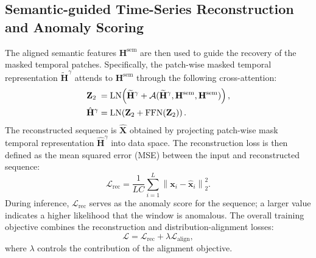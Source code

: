 \documentclass[letterpaper]{article} %
\begin{document}
\subsection{Semantic-guided Time-Series Reconstruction and Anomaly Scoring}
The aligned semantic features
$\mathbf{H}^{\mathrm{sem}}$ are then used to guide the recovery of the masked temporal patches. Specifically, the patch-wise masked temporal representation 
$\widetilde{\mathbf{H}}^{\gamma}$ attends to
$\mathbf{H}^{\mathrm{sem}}$ through the following cross-attention:
\begin{align}
    \makebox[0pt][l]{\ensuremath{\mathbf{Z}_{2}}}
    \phantom{\hat{\mathbf{H}}^{\gamma}}
    &=
    \operatorname{LN}\!\left(
    \widetilde{\mathbf{H}}^{\gamma}
    +\mathcal{A}(
    \widetilde{\mathbf{H}}^{\gamma},
    \mathbf{H}^{\mathrm{sem}},
    \mathbf{H}^{\mathrm{sem}})
    \right),\\
    \hat{\mathbf{H}}^{\gamma}
    &=
    \operatorname{LN}\!\left(
    \mathbf{Z}_{2}+\operatorname{FFN}(\mathbf{Z}_{2})
    \right).
\end{align}
The reconstructed sequence is $\widehat{\mathbf{X}}$ obtained by projecting patch-wise mask temporal representation $\hat{\mathbf{H}}^{\gamma}$ into data space.  The reconstruction loss is then defined as the mean squared error (MSE) between the input and reconstructed sequence:
\begin{equation}
    \mathcal{L}_{\mathrm{rec}}
    =
    \frac{1}{LC}\sum_{i=1}^{L}
    \left\|
    \mathbf{x}_i-\widehat{\mathbf{x}}_i
    \right\|_{2}^{2}.
\end{equation}
During inference, $\mathcal{L}_{\mathrm{rec}}$ serves as the
anomaly score for the sequence; a larger value indicates a higher
likelihood that the window is anomalous.
The overall training objective combines the reconstruction and
distribution-alignment losses:
\begin{equation}
    \mathcal{L}
    =
    \mathcal{L}_{\mathrm{rec}}
    +
    \lambda
    \mathcal{L}_{\mathrm{align}},
\end{equation}
where $\lambda$ controls the contribution of the alignment objective.
\end{document}
